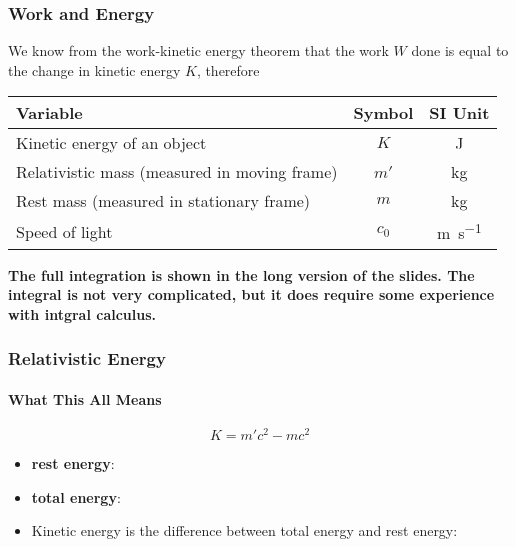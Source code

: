 \documentclass[12pt,compress,aspectratio=169]{beamer}
\newcommand{\eq}[2]{\vspace{#1}{\Large\begin{displaymath}#2\end{displaymath}}}
\begin{document}
\begin{frame}
  \frametitle{Work and Energy}

  We know from the work-kinetic energy theorem that the work $W$ done is equal
  to the change in kinetic energy $K$, therefore
 
  \eq{-.2in}{ \boxed{K=m'c^2-mc^2} }

  \vspace{-.1in}
  \begin{center}
    \begin{tabular}{l|c|c}
      \rowcolor{pink}
      \textbf{Variable} & \textbf{Symbol} & \textbf{SI Unit}\\ \hline
      Kinetic energy of an object & $K$  & \si{\joule}\\
      Relativistic mass (measured in moving frame) & $m'$ & \si{\kilo\gram}\\
      Rest mass (measured in stationary frame) & $m$  & \si{\kilo\gram}\\
      Speed of light              & $c_0$ & \si{\metre\per\second}
    \end{tabular}
  \end{center}

  \textbf{The full integration is shown in the long version of the slides. The
    integral is not very complicated, but it does require some experience with
    intgral calculus.}
\end{frame}

\begin{frame}
  \frametitle{Relativistic Energy}
  \framesubtitle{What This All Means}
  {\Large
    \begin{displaymath}
      \boxed{K=m'c^2-mc^2}
    \end{displaymath}
  }

  \begin{itemize}
  \item\vspace{-.3in}\textbf{rest energy}:
  
    \eq{-.4in}{ E_0=mc^2 }
  \item\textbf{total energy}:
    
    \eq{-.3in}{
      E_T=m'c^2=\gamma mc^2
    }
  \item Kinetic energy is the difference between total energy and rest energy:

    \eq{-.3in}{
      K=E_T-E_0
    }
  \end{itemize}
\end{frame}
\end{document}
